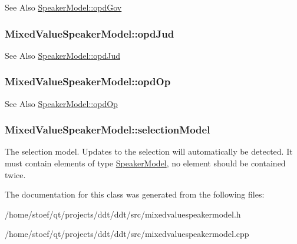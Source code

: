 \begin{DoxySeeAlso}{See Also}
\hyperlink{classSpeakerModel_a7a7dafddf0d9f0bb60e5e138277b50fd}{Speaker\-Model\-::opd\-Gov} 
\end{DoxySeeAlso}
\hypertarget{classMixedValueSpeakerModel_ad7a22ac891701f43d71a0ee50647f41f}{
\subsubsection[{opd\-Jud}]{ Mixed\-Value\-Speaker\-Model\-::opd\-Jud\hspace{0.3cm}{\ttfamily [read]}}}\label{classMixedValueSpeakerModel_ad7a22ac891701f43d71a0ee50647f41f}
\begin{DoxySeeAlso}{See Also}
\hyperlink{classSpeakerModel_a427f9e7d98bcbaea06f395eb82271a56}{Speaker\-Model\-::opd\-Jud} 
\end{DoxySeeAlso}
\hypertarget{classMixedValueSpeakerModel_a4da92388fbadb9aa5091d80f99078404}{
\subsubsection[{opd\-Op}]{ Mixed\-Value\-Speaker\-Model\-::opd\-Op\hspace{0.3cm}{\ttfamily [read]}}}\label{classMixedValueSpeakerModel_a4da92388fbadb9aa5091d80f99078404}
\begin{DoxySeeAlso}{See Also}
\hyperlink{classSpeakerModel_a60ebe1609153ba734e8d5449643cd85e}{Speaker\-Model\-::opd\-Op} 
\end{DoxySeeAlso}
\hypertarget{classMixedValueSpeakerModel_a58e2d9f253efcec1338b063636f671c7}{
\subsubsection[{selection\-Model}]{ Mixed\-Value\-Speaker\-Model\-::selection\-Model\hspace{0.3cm}{\ttfamily [write]}}}\label{classMixedValueSpeakerModel_a58e2d9f253efcec1338b063636f671c7}
The selection model. Updates to the selection will automatically be detected. It must contain elements of type \hyperlink{classSpeakerModel}{Speaker\-Model}, no element should be contained twice. 

The documentation for this class was generated from the following files\-:\begin{DoxyCompactItemize}
\item 
/home/stoef/qt/projects/ddt/ddt/src/mixedvaluespeakermodel.\-h\item 
/home/stoef/qt/projects/ddt/ddt/src/mixedvaluespeakermodel.\-cpp\end{DoxyCompactItemize}
